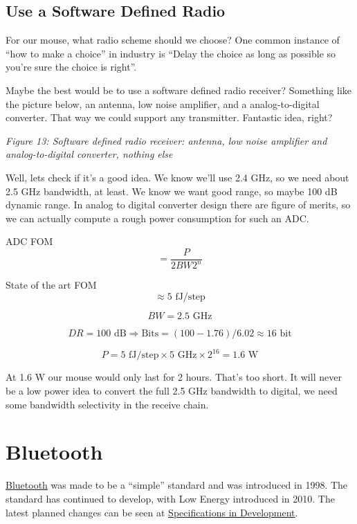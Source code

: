 \subsection{Use a Software Defined
Radio}\label{use-a-software-defined-radio}

For our mouse, what radio scheme should we choose? One common instance
of ``how to make a choice'' in industry is ``Delay the choice as long as
possible so you're sure the choice is right''.

Maybe the best would be to use a software defined radio receiver?
Something like the picture below, an antenna, low noise amplifier, and a
analog-to-digital converter. That way we could support any transmitter.
Fantastic idea, right?


{
\centering
{}
}

\emph{Figure 13: Software defined radio receiver: antenna, low noise
amplifier and analog-to-digital converter, nothing else}

Well, lets check if it's a good idea. We know we'll use 2.4 GHz, so we
need about 2.5 GHz bandwidth, at least. We know we want good range, so
maybe 100 dB dynamic range. In analog to digital converter design there
are figure of merits, so we can actually compute a rough power
consumption for such an ADC.

ADC FOM \[ = \frac{P}{2 BW 2^n}\]

State of the art FOM \[\approx 5 \text{ fJ/step}\]

\[ BW = 2.5\text{ GHz}\]

\[ DR = 100\text{ dB} \Rightarrow \text{Bits} = (100-1.76)/6.02 \approx 16\text{ bit} \]

\[ P = 5\text{ fJ/step} \times 5 \text{ GHz} \times 2^{16} = 1.6\text{ W}\]

At 1.6 W our mouse would only last for 2 hours. That's too short. It
will never be a low power idea to convert the full 2.5 GHz bandwidth to
digital, we need some bandwidth selectivity in the receive chain.

\section{Bluetooth}\label{bluetooth}

\href{https://www.bluetooth.com/specifications/specs/core-specification-5-4/}{Bluetooth}
was made to be a ``simple'' standard and was introduced in 1998. The
standard has continued to develop, with Low Energy introduced in 2010.
The latest planned changes can be seen at
\href{https://www.bluetooth.com/specifications/specifications-in-development/}{Specifications
in Development}.

